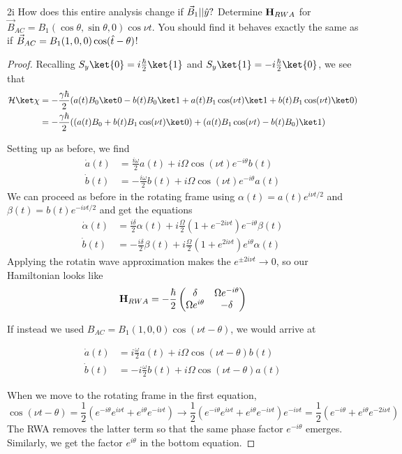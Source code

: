 \documentclass[12pt]{article}
\newcommand{\HH}{\mathcal{H}}
\begin{document}
\begin{exc}{2i}
     How does this entire analysis change if $\vec B_1||\vu y?$ Determine 
$\vb H_{RWA}$ for $\vec B_{AC} = B_1(\cos\theta, \sin\theta,0)\cos\nu t$. You
should find it behaves exactly the same as if $\vec B_{AC} = B_1(1, 0, 0)\cos(\vu t - \theta)$!
\end{exc}
\begin{proof}
    Recalling $S_y\ket{0} = i\frac\hbar 2\ket{1}$ and $S_y \ket{1} = -i\frac\hbar2\ket{0}$, we see that 
\begin{align*}
     \HH \ket \chi 
        &= -\frac{\gamma \hbar}{2}(a(t)B_0 \ket 0 - b(t) B_0\ket 1 + a(t)B_1 \cos (\nu t)\ket 1  + b(t)B_1 \cos(\nu t)\ket 0)\\
        &= -\frac{\gamma \hbar}{2}((a(t)B_0 + b(t)B_1 \cos(\nu t)\ket 0 ) + (a(t)B_1 \cos(\nu t) - b(t)B_0)\ket 1 )
\end{align*}

Setting up as before, we find 
\begin{align*}
    \dot a(t) &= \frac{i\omega}{2}a(t) + i\Omega\cos(\nu t)e^{-i\theta}b(t) \\ 
    \dot b(t) &= -\frac{i\omega}{2}b(t) + i\Omega\cos(\nu t)e^{-i\theta}a(t) 
\end{align*}
We can proceed as before in the rotating frame using $\alpha(t) = a(t)e^{i\nu t/2}$ and $\beta(t) = b(t)e^{-i\nu t/2}$ and get the equations 
\begin{align*}
    \dot \alpha(t) &= \frac{i\delta}{2}\alpha(t) + i\frac{\Omega}{2}(1 + e^{-2i\nu t})e^{-i\theta}\beta(t) \\ 
    \dot b(t) &= -\frac{i\delta}{2}\beta(t) + i\frac{\Omega}2 (1 + e^{2i\nu t})e^{i\theta}\alpha(t)
\end{align*}
Applying the rotatin wave approximation makes the $e^{\pm 2i \nu t} \to 0$, so our Hamiltonian looks like 
\begin{align*}
    \vb H_{RWA} = -\frac{\hbar}2\begin{pmatrix}
        \delta & \Omega e^{-i\theta} \\ 
        \Omega e^{i\theta} & -\delta
    \end{pmatrix}
\end{align*}

If instead we used $B_{AC} = B_1(1, 0, 0)\cos(\nu t - \theta)$, we would arrive at 

\begin{align*}
     \dot a(t) &= i\frac{\omega}{2} a(t) + i\Omega \cos(\nu t - \theta)b(t)\\ 
    \dot b(t) &= -i \frac{\omega}{2} b(t) + i \Omega \cos(\nu t - \theta)a(t)
\end{align*}

When we move to the rotating frame in the first equation, 
\[\cos(\nu t - \theta) = \frac12(e^{-i\theta} e^{i \nu t} + e^{i \theta}e^{-i \nu t}) \to \frac12(e^{-i\theta} e^{i \nu t} + e^{i \theta}e^{-i \nu t}) e^{-i\nu t} = \frac12(e^{-i\theta} + e^{i\theta}e^{-2i\nu t})\]
The RWA removes the latter term so that the same phase factor $e^{-i \theta}$ emerges. Similarly, we get the factor $e^{i\theta}$ in the bottom equation. 
\end{proof}
\end{document}
